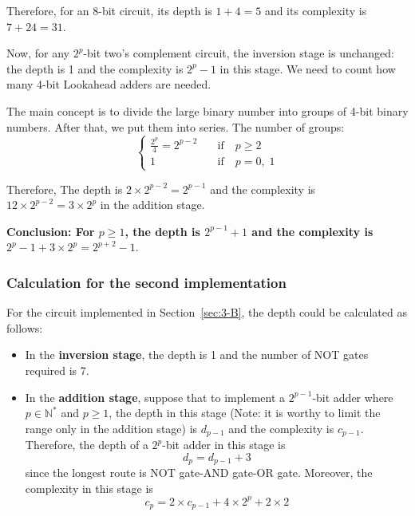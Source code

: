 \documentclass[conference]{IEEEtran}
\begin{document}
Therefore, for an 8-bit circuit, its depth is $1+4=5$ and its complexity is $7+24=31$.

Now, for any $2^p$-bit two's complement circuit, the inversion stage is unchanged: the depth is 1 and the complexity is $2^p-1$ in this stage. We need to count how many 4-bit Lookahead adders are needed.

The main concept is to divide the large binary number into groups of 4-bit binary numbers. After that, we put them into series. The number of groups: 
\begin{equation}
    \begin{cases}
        \frac{2^p}{4} = 2^{p-2} \quad &\text{if} \quad p \geq 2     \\
        1 &\text{if} \quad  p = 0, \; 1
    \end{cases}
\end{equation}

Therefore, The depth is $2\times 2^{p-2} = 2 ^{p-1}$ and the complexity is $12 \times 2^{p-2} = 3 \times 2^p$ in the addition stage.


\textbf{Conclusion: For $p \geq 1$, the depth is $2^{p-1} + 1$ and the complexity is $2^p - 1 + 3 \times 2^p = 2^{p+2}-1$}.


\subsubsection{Calculation for the second implementation}\label{sec:q4-2}

For the circuit implemented in Section~\ref{sec:3-B}, the depth could be calculated as follows:

\begin{itemize}
    \item In the \textbf{inversion stage}, the depth is 1 and the number of NOT gates required is 7.
    \item In the \textbf{addition stage}, suppose that to implement a $2^{p-1}$-bit adder where $p \in \mathbb{N}^*$ and $p \geq 1$, the depth in this stage (Note: it is worthy to limit the range only in the addition stage) is $d_{p-1}$ and the complexity is $c_{p-1}$. 
    Therefore, the depth of a $2^p$-bit adder in this stage is 
    \begin{equation}
        d_p = d_{p-1} + 3
    \end{equation}
    since the longest route is NOT gate-AND gate-OR gate.
    Moreover, the complexity in this stage is
    \begin{equation}\label{eq:complexity}
        c_p = 2 \times c_{p-1} + 4 \times 2^p + 2 \times 2
    \end{equation}
\end{itemize}
\end{document}
